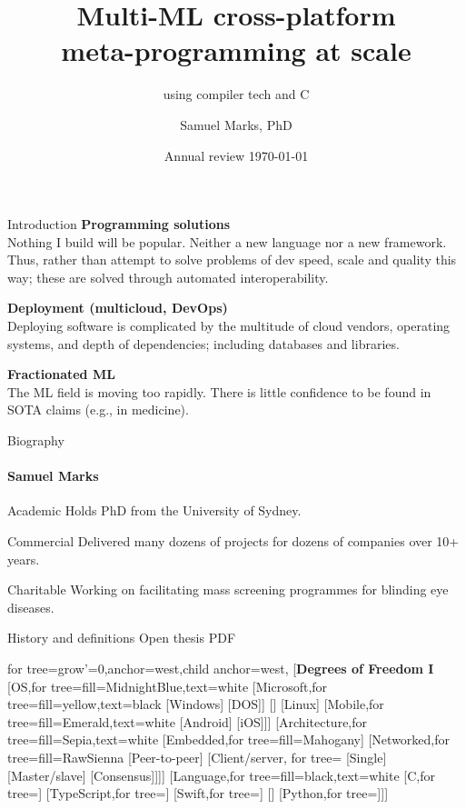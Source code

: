\documentclass[aspectratio=169,xcolor=dvipsnames]{beamer}
\author{Samuel Marks, PhD}
\title{Multi-ML cross-platform\\meta-programming at scale}
\subtitle{using compiler tech and C}
\institute{Computer Science Engineering}
\date{Annual review \today}
\begin{document}
\begin{frame}[plain]
	\titlepage
\end{frame}

\begin{frame}{Introduction}
	\textbf{Programming solutions}\\
	Nothing I build will be popular. Neither a new language nor a new framework. Thus, rather than attempt to solve problems of dev speed, scale and quality this way; these are solved through automated interoperability.\vspace{1em}

	\textbf{Deployment (multicloud, DevOps)}\\
	Deploying software is complicated by the multitude of cloud vendors, operating systems, and depth of dependencies; including databases and libraries.\vspace{1em}

	\textbf{Fractionated ML}\\
	The ML field is moving too rapidly. There is little confidence to be found in SOTA claims (e.g., in medicine).
\end{frame}

\begin{frame}{Biography}
	\framesubtitle{Samuel Marks}
	\begin{block}{Academic}
		Holds PhD from the University of Sydney.
	\end{block}

	\begin{exampleblock}{Commercial}
		Delivered many dozens of projects for dozens of companies over 10+ years.
	\end{exampleblock}

	\begin{alertblock}{Charitable}
		Working on facilitating mass screening programmes for blinding eye diseases.
	\end{alertblock}
\end{frame}

\begin{frame}{History and definitions}
	Open thesis PDF
\end{frame}

\begin{frame}
	\begin{forest} for tree={grow'=0,anchor=west,child anchor=west},
		[\textbf{Degrees of Freedom I}
				[OS,for tree={fill=MidnightBlue,text=white}
						[Microsoft,for tree={fill=yellow,text=black}
								[Windows]
								[DOS]]
						[\textellipsis{}]
						[Linux]
						[Mobile,for tree={fill=Emerald,text=white}
								[Android]
								[iOS]]]
				[Architecture,for tree={fill=Sepia,text=white}
						[Embedded,for tree={fill=Mahogany}]
						[Networked,for tree={fill=RawSienna}
								[Peer-to-peer]
								[Client/server, for tree={}
										[Single]
										[Master/slave]
										[Consensus]]]]
				[Language,for tree={fill=black,text=white}
						[C,for tree={}]
						[TypeScript,for tree={}]
						[Swift,for tree={}]
						[\textellipsis{}]
						[Python,for tree={}]]]
	\end{forest}
\end{frame}
\end{document}
